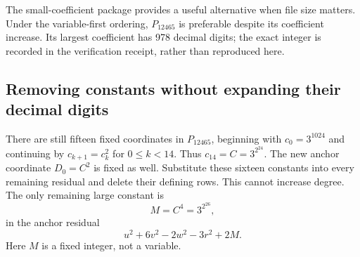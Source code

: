 \documentclass[11pt]{article}
\theoremstyle{definition}
\begin{document}
The small-coefficient package provides a useful alternative when file
size matters. Under the variable-first ordering,
$P_{12465}$ is preferable despite its coefficient increase. Its largest
coefficient has 978 decimal digits; the exact integer is recorded in the
verification receipt, rather than reproduced here.

\subsection{Removing constants without expanding their decimal digits}

There are still fifteen fixed coordinates in $P_{12465}$, beginning
with $c_0=3^{1024}$ and continuing by $c_{k+1}=c_k^2$ for
$0\leq k<14$. Thus $c_{14}=C=3^{2^{24}}$. The new anchor coordinate
$D_0=C^2$ is fixed as well. Substitute these sixteen constants into
every remaining residual and delete their defining rows. This cannot
increase degree. The only remaining large constant is
\[
 M=C^4=3^{2^{26}},
\]
in the anchor residual
\[
 u^2+6v^2-2w^2-3r^2+2M.
\]
Here $M$ is a fixed integer, not a variable.
\end{document}
